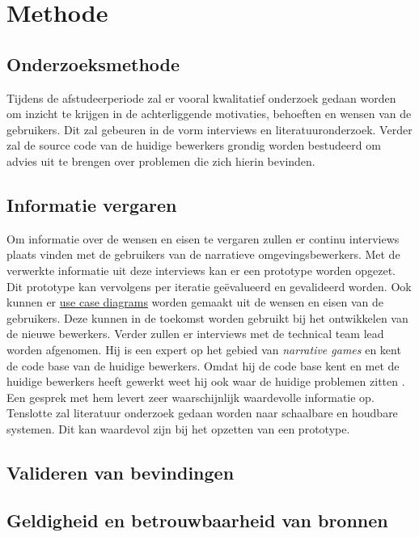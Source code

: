 \documentclass{report}
\begin{document}
\chapter{Methode}

\section{Onderzoeksmethode}
Tijdens de afstudeerperiode zal er vooral kwalitatief onderzoek gedaan worden om inzicht te krijgen in de achterliggende motivaties, behoeften en wensen van de gebruikers. Dit zal gebeuren in de vorm interviews en literatuuronderzoek. Verder zal de source code van de huidige bewerkers grondig worden bestudeerd om advies uit te brengen over problemen die zich hierin bevinden. 

\section{Informatie vergaren}
Om informatie over de wensen en eisen te vergaren zullen er continu interviews plaats vinden met de gebruikers van de narratieve omgevingsbewerkers. Met de verwerkte informatie uit deze interviews kan er een prototype worden opgezet. Dit prototype kan vervolgens per iteratie ge{\"e}valueerd en gevalideerd worden. Ook kunnen er \href{http://www.agilemodeling.com/artifacts/useCaseDiagram.htm}{use case diagrams} worden gemaakt uit de wensen en eisen van de gebruikers. Deze kunnen in de toekomst worden gebruikt bij het ontwikkelen van de nieuwe bewerkers.
Verder zullen er interviews met de technical team lead worden afgenomen. Hij is een expert op het gebied van \emph{narrative games} en kent de code base van de huidige bewerkers. Omdat hij de code base kent en met de huidige bewerkers heeft gewerkt weet hij ook waar de huidige problemen zitten \cite{interviewivo}. Een gesprek met hem levert zeer waarschijnlijk waardevolle informatie op.
Tenslotte zal literatuur onderzoek gedaan worden naar schaalbare en houdbare systemen. Dit kan waardevol zijn bij het opzetten van een prototype.

\section{Valideren van bevindingen}

\section{Geldigheid en betrouwbaarheid van bronnen}
\end{document}
